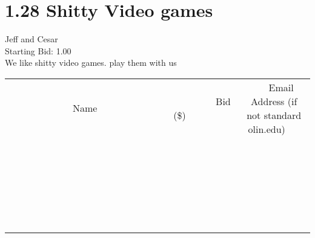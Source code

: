 \documentclass[11pt]{article}
\begin{document}
					\section*{1.28 Shitty Video games}
					Jeff and Cesar \\
					Starting Bid: 1.00 \\
					We like shitty video games. play them with us \\
					[6ex]
					\begin{tabular}{c c c}
						~~~~~~~~~~~~~Name~~~~~~~~~~~~~ & ~~~~~~~~~Bid (\$)~~~~~~~~~ & ~~~Email Address (if not standard olin.edu)~~~ \\
				
 & & \\
\hline
 & & \\
\hline
 & & \\
\hline
 & & \\
\hline
 & & \\
\hline
 & & \\
\hline
 & & \\
\hline
 & & \\
\hline
 & & \\
\hline
 & & \\
\hline
 & & \\
\hline
 & & \\
\hline
 & & \\
\hline
 & & \\
\hline
 & & \\
\hline
 & & \\
\hline
 & & \\
\hline
 & & \\
\hline
 & & \\
\hline
 & & \\
\hline
 & & \\
\hline
 & & \\
\hline
 & & \\
\hline
 & & \\
\hline
 & & \\
\hline
 & & \\
\hline
					\end{tabular}
					\clearpage
				
\end{document}
